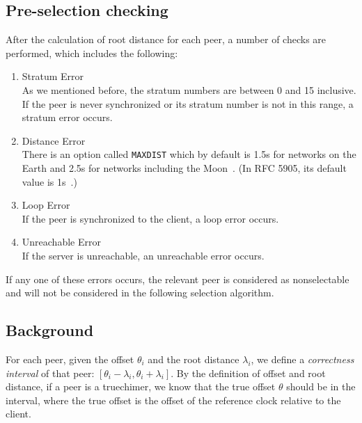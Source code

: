 \subsection{Pre-selection checking}%
\label{sub:pre_selection_checking}
After the calculation of root distance for each peer, a number of checks are
performed, which includes the following:
\begin{enumerate}
    \item Stratum Error\\
        As we mentioned before, the stratum numbers are between 0 and 15
        inclusive. If the peer is never synchronized or its stratum number is
        not in this range, a stratum error occurs.
    \item Distance Error\\
        There is an option called \verb|MAXDIST| which by default is 1.5s for
        networks on the Earth and 2.5s for networks including the
        Moon~\cite{clock_selection}. (In RFC 5905, its default value is
        1s~\cite{rfc5905}.)
    \item Loop Error\\
        If the peer is synchronized to the client, a loop error occurs.
    \item Unreachable Error\\
        If the server is unreachable, an unreachable error occurs.
\end{enumerate}
If any one of these errors occurs, the relevant peer is considered as
nonselectable and will not be considered in the following selection
algorithm.

\subsection{Background}%
\label{sub:selection_algorithm_background}

For each peer, given the offset $\theta_i$ and the root distance $\lambda_i$,
we define a \emph{correctness interval} of that peer: $[\theta_i - \lambda_i,
\theta_i + \lambda_i]$. By the definition of offset and root distance, if a
peer is a truechimer, we know that the true offset $\theta$ should be in the
interval, where the true offset is the offset of the reference clock relative
to the client.

